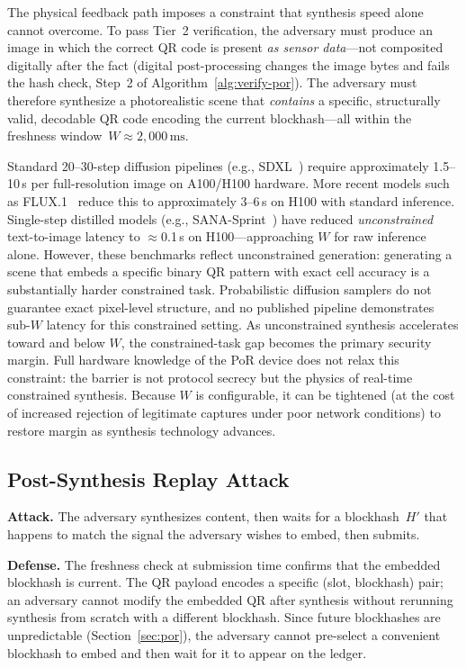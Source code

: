 \documentclass[11pt]{article}
\begin{document}
The physical feedback path imposes a constraint that synthesis speed alone
cannot overcome.  To pass Tier~2 verification, the adversary must produce an
image in which the correct QR code is present \emph{as sensor data}---not
composited digitally after the fact (digital post-processing changes the image
bytes and fails the hash check, Step~2 of Algorithm~\ref{alg:verify-por}).
The adversary must therefore synthesize a photorealistic scene that
\emph{contains} a specific, structurally valid, decodable QR code encoding the
current blockhash---all within the freshness window~$W \approx 2{,}000\,\text{ms}$.

Standard 20--30-step diffusion pipelines (e.g., SDXL~\cite{sdxl}) require
approximately 1.5--10\,s per full-resolution image on A100/H100 hardware.
More recent models such as FLUX.1~\cite{flux} reduce this to approximately
3--6\,s on H100 with standard inference. Single-step distilled models
(e.g., SANA-Sprint~\cite{sana-sprint}) have reduced \emph{unconstrained}
text-to-image latency to $\approx$0.1\,s on H100---approaching $W$ for raw
inference alone. However, these benchmarks reflect unconstrained generation:
generating a scene that embeds a specific binary QR pattern with exact cell
accuracy is a substantially harder constrained task. Probabilistic diffusion
samplers do not guarantee exact pixel-level structure, and no published
pipeline demonstrates sub-$W$ latency for this constrained setting.
As unconstrained synthesis accelerates toward and below $W$, the constrained-task
gap becomes the primary security margin. Full hardware knowledge of the
PoR device does not relax this constraint: the barrier is not protocol
secrecy but the physics of real-time constrained synthesis. Because $W$ is configurable, it can be tightened (at the cost of
increased rejection of legitimate captures under poor network conditions) to
restore margin as synthesis technology advances.

\subsection{Post-Synthesis Replay Attack}

\textbf{Attack.} The adversary synthesizes content, then waits for a
blockhash~$H'$ that happens to match the signal the adversary wishes to
embed, then submits.

\textbf{Defense.} The freshness check at submission time confirms that the embedded blockhash is
current. The QR payload encodes a specific (slot,
blockhash) pair; an adversary cannot modify the embedded QR after synthesis
without rerunning synthesis from scratch with a different blockhash. Since
future blockhashes are unpredictable (Section~\ref{sec:por}), the adversary
cannot pre-select a convenient blockhash to embed and then wait for it to
appear on the ledger.
\end{document}
